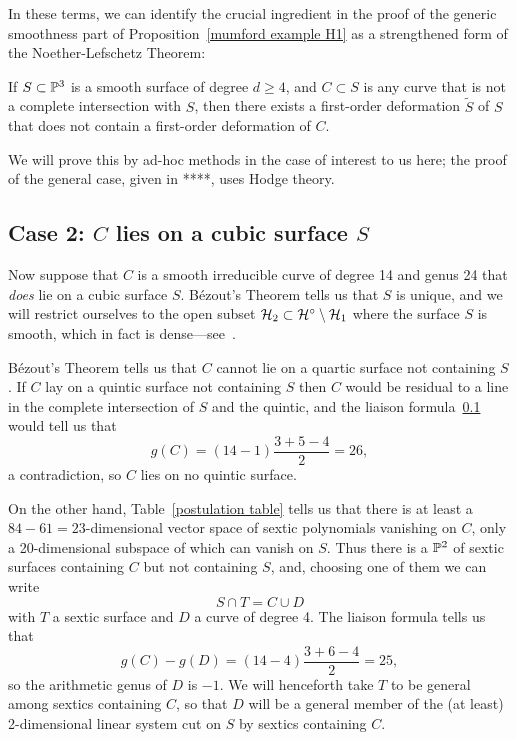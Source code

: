 In these terms, we can identify the crucial ingredient in the proof of the generic smoothness part of Proposition~\ref{mumford example H1} as a strengthened form of the Noether-Lefschetz Theorem:

\begin{theorem}
If $S \subset \PP^3$ is a smooth surface of degree $d \geq 4$, and $C \subset S$ is any curve that is not a complete intersection with $S$, then there exists a first-order deformation $\tilde S$ of $S$ that does not contain a first-order deformation of $C$.
\end{theorem}

We will prove this by ad-hoc methods in the case of interest to us here; the proof of the general case, given in ****, uses Hodge theory.


\subsection{Case 2: $C$ lies on a cubic surface $S$}

Now suppose that $C$ is a smooth irreducible curve of degree 14 and genus 24 that \emph{does} lie on a cubic surface $S$. B\'ezout's Theorem tells us that  $S$  is unique, and we will restrict ourselves to the open subset $\cH_2 \subset \cH^\circ \setminus \cH_1$ where the surface $S$ is smooth, which in fact is dense---see~\cite{Nasu2008}.

B\'ezout's Theorem tells us that $C$ cannot lie on a quartic surface not containing $S$. If $C$ lay on a quintic surface not containing $S$ then $C$ would be residual to a line in the complete intersection of $S$ and the quintic, and the liaison formula~\ref{} would tell us that 
$$
g(C) = (14-1)\frac{3+5-4}{2} = 26,
$$
a contradiction, so $C$ lies on no quintic surface.

On the other hand, Table~\ref{postulation table} tells us that there is at least a $84-61 = 23$-dimensional vector space of sextic polynomials vanishing on  $C$, only a 20-dimensional subspace of which can vanish on $S$. Thus there is a $\PP^2$ of sextic surfaces containing $C$ but not containing $S$, and, choosing one of them we can write
$$
S \cap T = C \cup D
$$
with $T$ a sextic surface and $D$ a curve of degree 4. The liaison formula  tells us that
$$
g(C) - g(D) = (14 - 4)\frac{3+6-4}{2} = 25,
$$
so the arithmetic genus of $D$ is $-1$. We will henceforth take $T$ to be general among sextics containing $C$, so that $D$ will be a general member of the (at least) 2-dimensional linear system cut on $S$ by sextics containing $C$.

